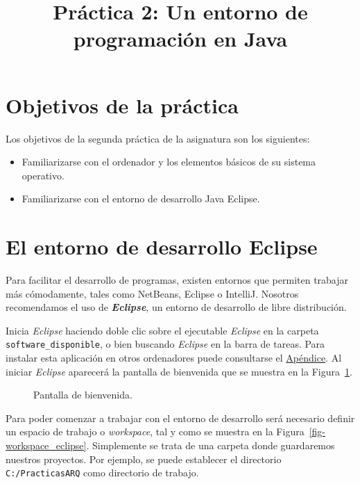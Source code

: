 \documentclass[
  spanish,
  11pt,
  a4paper,
  DIV=11,
  numbers=noendperiod]{scrartcl}
\title{Práctica 2: Un entorno de programación en Java}
\author{}
\date{}
\providecommand{\tightlist}{%
  \setlength{\itemsep}{0pt}\setlength{\parskip}{0pt}}
\renewcommand*\contentsname{Tabla de contenidos}
\newcommand\contentsname{Tabla de contenidos}
\begin{document}
\maketitle

\renewcommand*\contentsname{Tabla de contenidos}
{
\hypersetup{linkcolor=}
\setcounter{tocdepth}{2}
\tableofcontents
}

\clearpage

\section{Objetivos de la práctica}\label{objetivos-de-la-pruxe1ctica}

Los objetivos de la segunda práctica de la asignatura son los siguientes:

\begin{itemize}
\tightlist
\item
 Familiarizarse con el ordenador y los elementos básicos de su sistema operativo.
\item
 Familiarizarse con el entorno de desarrollo Java Eclipse.
\end{itemize}

\section{El entorno de desarrollo Eclipse}\label{el-entorno-de-desarrollo-eclipse}

Para facilitar el desarrollo de programas, existen entornos que permiten trabajar más cómodamente, tales como NetBeans, Eclipse o IntelliJ. Nosotros recomendamos el uso de \textbf{\emph{Eclipse}}, un entorno de desarrollo de libre distribución.

Inicia \emph{Eclipse} haciendo doble clic sobre el ejecutable \emph{Eclipse} en la carpeta \texttt{software\_disponible}, o bien buscando \emph{Eclipse} en la barra de tareas. Para instalar esta aplicación en otros ordenadores puede consultarse el \hyperref[appendix-installation]{Apéndice}. Al iniciar \emph{Eclipse} aparecerá la pantalla de bienvenida que se muestra en la Figura~\ref{fig-init_eclipse}.

\begin{figure}
\caption{Pantalla de bienvenida.}\label{fig-init_eclipse}
\end{figure}

Para poder comenzar a trabajar con el entorno de desarrollo será necesario definir un espacio de trabajo o \emph{workspace}, tal y como se muestra en la Figura~\ref{fig-workspace_eclipse}. Simplemente se trata de una carpeta donde guardaremos nuestros proyectos. Por ejemplo, se puede establecer el directorio \texttt{C:/PracticasARQ} como directorio de trabajo.
\end{document}
